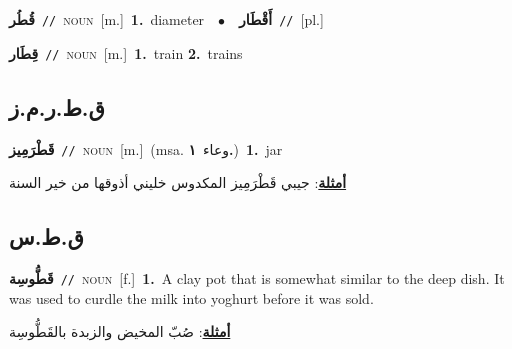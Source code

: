 \documentclass[10pt,a4paper,twoside]{article} %
\begin{document}
\begin{multicols}{2}
{\setlength\topsep{0pt}\textbf{\foreignlanguage{arabic}{قُطُر}}\ {\color{gray}\texttt{//}\color{black}}\ \textsc{noun}\ [m.]\ \textbf{1.}~diameter\ \ $\bullet$\ \ \setlength\topsep{0pt}\textbf{\foreignlanguage{arabic}{أَقْطَار}}\ {\color{gray}\texttt{//}\color{black}}\ [pl.]\ } \vspace{2mm}

{\setlength\topsep{0pt}\textbf{\foreignlanguage{arabic}{قِطَار}}\ {\color{gray}\texttt{//}\color{black}}\ \textsc{noun}\ [m.]\ \textbf{1.}~train  \textbf{2.}~trains\ } \vspace{2mm}

\vspace{-3mm}
\subsection*{\color{blue}\foreignlanguage{arabic}{ق.ط.ر.م.ز}\color{blue}{ (ntws)}} 

{\setlength\topsep{0pt}\textbf{\foreignlanguage{arabic}{قَطْرَمِيز}}\ {\color{gray}\texttt{//}\color{black}}\ \textsc{noun}\ [m.]\ \color{gray}(msa. \foreignlanguage{arabic}{وعاء}~\foreignlanguage{arabic}{\textbf{١.}})\color{black}\ \textbf{1.}~jar\  \begin{flushright}\color{gray}\foreignlanguage{arabic}{\textbf{\underline{\foreignlanguage{arabic}{أمثلة}}}: جيبي قَطْرَمِيز المكدوس خليني أذوقها من خير السنة}\end{flushright}\color{black}} \vspace{2mm}

\vspace{-3mm}
\subsection*{\color{blue}\foreignlanguage{arabic}{ق.ط.س}\color{blue}{}} 

{\setlength\topsep{0pt}\textbf{\foreignlanguage{arabic}{قَطُّوسِة}}\ {\color{gray}\texttt{//}\color{black}}\ \textsc{noun}\ [f.]\ \textbf{1.}~A clay pot that is somewhat similar to the deep dish. It was used to curdle the milk into yoghurt before it was sold.\  \begin{flushright}\color{gray}\foreignlanguage{arabic}{\textbf{\underline{\foreignlanguage{arabic}{أمثلة}}}: صُبّ المخيض والزبدة بالقَطُّوسِة}\end{flushright}\color{black}} \vspace{2mm}


\end{multicols}
\end{document}
